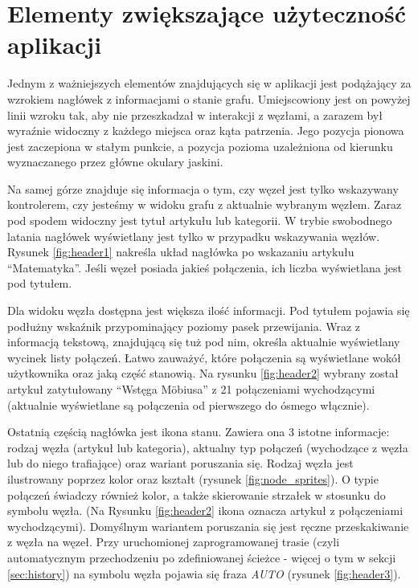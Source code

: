 \section{Elementy zwiększające użyteczność aplikacji}
\label{sec:elementy}
Jednym z ważniejszych elementów znajdujących się w aplikacji jest podążający za wzrokiem nagłówek z informacjami o stanie grafu. Umiejscowiony jest on powyżej linii wzroku tak, aby nie przeszkadzał w interakcji z węzłami, a zarazem był wyraźnie widoczny z każdego miejsca oraz kąta patrzenia. Jego pozycja pionowa jest zaczepiona w stałym punkcie, a pozycja pozioma uzależniona od kierunku wyznaczanego przez główne okulary jaskini.

Na samej górze znajduje się informacja o tym, czy węzeł jest tylko wskazywany kontrolerem, czy jesteśmy w widoku grafu z aktualnie wybranym węzłem. Zaraz pod spodem widoczny jest tytuł artykułu lub kategorii. W trybie swobodnego latania nagłówek wyświetlany jest tylko w przypadku wskazywania węzłów. Rysunek \ref{fig:header1} nakreśla układ nagłówka po wskazaniu artykułu ``Matematyka''. Jeśli węzeł posiada jakieś połączenia, ich liczba wyświetlana jest pod tytułem.


Dla widoku węzła dostępna jest większa ilość informacji. Pod tytułem pojawia się podłużny wskaźnik przypominający poziomy pasek przewijania. Wraz z informacją tekstową, znajdującą się tuż pod nim, określa aktualnie wyświetlany wycinek listy połączeń. Łatwo zauważyć, które połączenia są wyświetlane wokół użytkownika oraz jaką część stanowią. Na rysunku \ref{fig:header2} wybrany został artykuł zatytułowany ``Wstęga Möbiusa'' z 21 połączeniami wychodzącymi (aktualnie wyświetlane są połączenia od pierwszego do ósmego włącznie).


Ostatnią częścią nagłówka jest ikona stanu. Zawiera ona 3 istotne informacje: rodzaj węzła (artykuł lub kategoria), aktualny typ połączeń (wychodzące z węzła lub do niego trafiające) oraz wariant poruszania się. Rodzaj węzła jest ilustrowany poprzez kolor oraz kształt (rysunek \ref{fig:node_sprites}). O typie połączeń świadczy również kolor, a także skierowanie strzałek w stosunku do symbolu węzła. (Na Rysunku \ref{fig:header2} ikona oznacza artykuł z połączeniami wychodzącymi). Domyślnym wariantem poruszania się jest ręczne przeskakiwanie z węzła na węzeł. Przy uruchomionej zaprogramowanej trasie (czyli automatycznym przechodzeniu po zdefiniowanej ścieżce - więcej o tym w sekcji \ref{sec:history}) na symbolu węzła pojawia się fraza \textit{AUTO} (rysunek \ref{fig:header3}).

